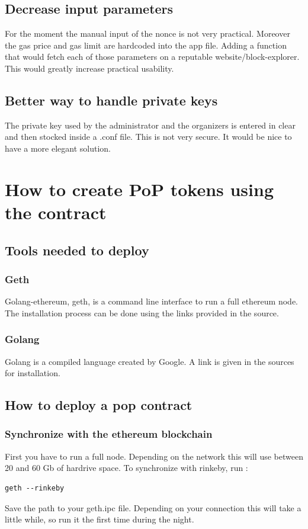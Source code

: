 \documentclass[11pt, a4paper, twoside, openright]{book} %
\begin{document}
\subsection{Decrease input parameters}
For the moment the manual input of the nonce is not very practical. Moreover the gas price and gas limit are hardcoded into the app file. Adding a function that would fetch each of those parameters on a reputable website/block-explorer. This would greatly increase practical usability.

\subsection{Better way to handle private keys}
The private key used by the administrator and the organizers is entered in clear and then stocked inside a .conf file. This is not very secure. It would be nice to have a more elegant solution.




\section{How to create PoP tokens using the contract}

\subsection{Tools needed to deploy}
\subsubsection*{Geth}
Golang-ethereum, geth, is a command line interface to run a full ethereum node. The installation process can be done using the links provided in the source.
\subsubsection*{Golang}
Golang is a compiled language created by Google. A link is given in the sources for installation.

\subsection{How to deploy a pop contract}
\subsubsection*{Synchronize with the ethereum blockchain}
First you have to run a full node. Depending on the network this will use between 20 and 60 Gb of hardrive space. To synchronize with rinkeby, run :
\begin{verbatim}
geth --rinkeby
\end{verbatim}
Save the path to your geth.ipc file.
Depending on your connection this will take a little while, so run it the first time during the night.
\end{document}
